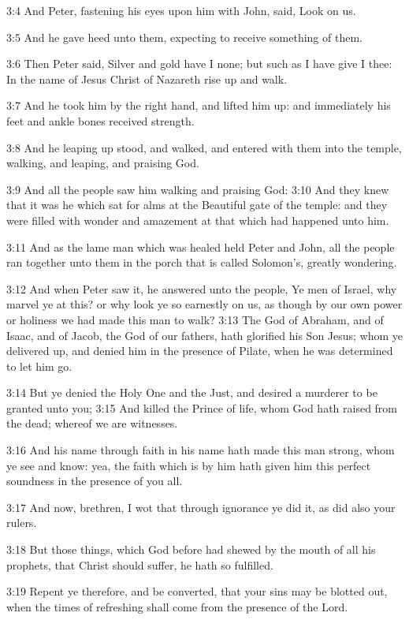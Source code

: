 3:4 And Peter, fastening his eyes upon him with John, said, Look on
us.

3:5 And he gave heed unto them, expecting to receive something of
them.

3:6 Then Peter said, Silver and gold have I none; but such as I have
give I thee: In the name of Jesus Christ of Nazareth rise up and walk.

3:7 And he took him by the right hand, and lifted him up: and
immediately his feet and ankle bones received strength.

3:8 And he leaping up stood, and walked, and entered with them into
the temple, walking, and leaping, and praising God.

3:9 And all the people saw him walking and praising God: 3:10 And they
knew that it was he which sat for alms at the Beautiful gate of the
temple: and they were filled with wonder and amazement at that which
had happened unto him.

3:11 And as the lame man which was healed held Peter and John, all the
people ran together unto them in the porch that is called Solomon's,
greatly wondering.

3:12 And when Peter saw it, he answered unto the people, Ye men of
Israel, why marvel ye at this? or why look ye so earnestly on us, as
though by our own power or holiness we had made this man to walk?
3:13 The God of Abraham, and of Isaac, and of Jacob, the God of our
fathers, hath glorified his Son Jesus; whom ye delivered up, and
denied him in the presence of Pilate, when he was determined to let
him go.

3:14 But ye denied the Holy One and the Just, and desired a murderer
to be granted unto you; 3:15 And killed the Prince of life, whom God
hath raised from the dead; whereof we are witnesses.

3:16 And his name through faith in his name hath made this man strong,
whom ye see and know: yea, the faith which is by him hath given him
this perfect soundness in the presence of you all.

3:17 And now, brethren, I wot that through ignorance ye did it, as did
also your rulers.

3:18 But those things, which God before had shewed by the mouth of all
his prophets, that Christ should suffer, he hath so fulfilled.

3:19 Repent ye therefore, and be converted, that your sins may be
blotted out, when the times of refreshing shall come from the presence
of the Lord.

